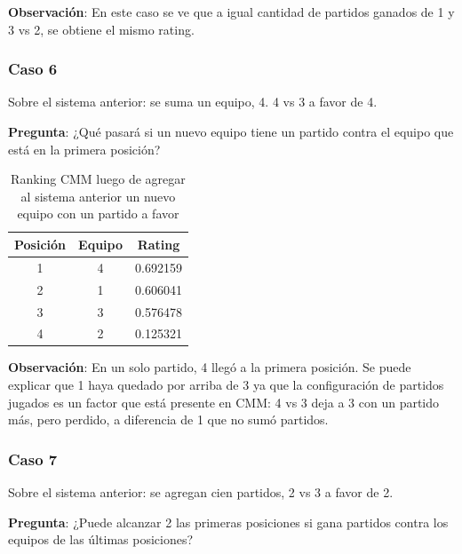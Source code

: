 \textbf{Observación}: En este caso se ve que a igual cantidad de partidos ganados de 1 y 3 vs 2, se obtiene el mismo rating.

\subsubsection*{Caso 6}

Sobre el sistema anterior: se suma un equipo, 4. 4 vs 3 a favor de 4.

\textbf{Pregunta}: ¿Qué pasará si un nuevo equipo tiene un partido contra el equipo que está en la primera posición?

\begin{table}[h!]
    \begin{center}
        \begin{tabular}{|c|c|c|}
        \hline
        \textbf{Posición} & \textbf{Equipo} & \textbf{Rating} \\
        \hline
        1 & 4 & 0.692159\\
        2 & 1 & 0.606041\\
        3 & 3 & 0.576478\\
        4 & 2 & 0.125321\\
        \hline
        \end{tabular}
        \caption{Ranking CMM luego de agregar al sistema anterior un nuevo equipo con un partido a favor}
        \label{cmm_caso_6}
    \end{center}
\end{table}

\textbf{Observación}: En un solo partido, 4 llegó a la primera posición. Se puede explicar que 1 haya quedado por arriba de 3 ya que la configuración de partidos jugados es un factor que está presente en CMM: 4 vs 3 deja a 3 con un partido más, pero perdido, a diferencia de 1 que no sumó partidos.

\newpage

\subsubsection*{Caso 7}\label{caso_7}

Sobre el sistema anterior: se agregan cien partidos, 2 vs 3 a favor de 2.

\textbf{Pregunta}: ¿Puede alcanzar 2 las primeras posiciones si gana partidos contra los equipos de las últimas posiciones?

